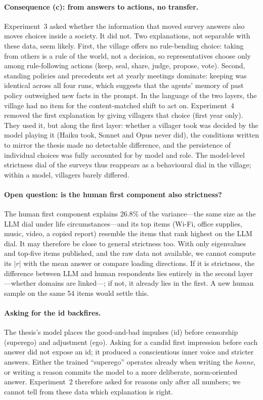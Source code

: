 \documentclass[11pt]{article}
\begin{document}
\paragraph{Consequence (c): from answers to actions, no transfer.}
Experiment~3 asked whether the information that moved survey answers also moves choices inside a society. It did not. Two explanations, not separable with these data, seem likely. First, the village offers no rule-bending choice: taking from others is a rule of the world, not a decision, so representatives choose only among rule-following actions (keep, seal, share, judge, propose, vote). Second, standing policies and precedents set at yearly meetings dominate: keeping was identical across all four runs, which suggests that the agents' memory of past policy outweighed new facts in the prompt. In the language of the two layers, the village had no item for the content-matched shift to act on. Experiment~4 removed the first explanation by giving villagers that choice (first year only). They used it, but along the first layer: whether a villager took was decided by the model playing it (Haiku took, Sonnet and Opus never did), the conditions written to mirror the thesis made no detectable difference, and the persistence of individual choices was fully accounted for by model and role. The model-level strictness dial of the surveys thus reappears as a behavioural dial in the village; within a model, villagers barely differed.

\paragraph{Open question: is the human first component also strictness?}
The human first component explains 26.8\% of the variance---the same size as the LLM dial under life circumstances---and its top items (Wi-Fi, office supplies, music, video, a copied report) resemble the items that rank highest on the LLM dial. It may therefore be close to general strictness too. With only eigenvalues and top-five items published, and the raw data not available, we cannot compute its $|r|$ with the mean answer or compare loading directions. If it is strictness, the difference between LLM and human respondents lies entirely in the second layer---whether domains are linked---; if not, it already lies in the first. A new human sample on the same 54 items would settle this.

\paragraph{Asking for the id backfires.}
The thesis's model places the good-and-bad impulses (id) before censorship (superego) and adjustment (ego). Asking for a candid first impression before each answer did not expose an id; it produced a conscientious inner voice and stricter answers. Either the trained ``superego'' operates already when writing the \emph{honne}, or writing a reason commits the model to a more deliberate, norm-oriented answer. Experiment~2 therefore asked for reasons only after all numbers; we cannot tell from these data which explanation is right.
\end{document}

